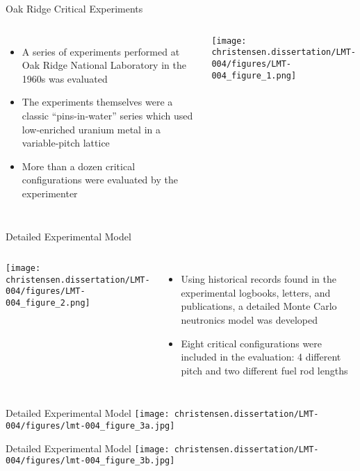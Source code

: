 \documentclass[10pt,aspectratio=169]{beamer}              %
\begin{document}
\begin{frame}{Oak Ridge Critical Experiments}
    \begin{columns}
            \begin{itemize}
                \item A series of experiments performed at Oak Ridge National Laboratory in the 1960s was evaluated
                \item The experiments themselves were a classic ``pins-in-water'' series which used low-enriched uranium metal in a variable-pitch lattice
                \item More than a dozen critical configurations were evaluated by the experimenter
            \end{itemize}
            \centering
            \texttt{[image: christensen.dissertation/LMT-004/figures/LMT-004\_figure\_1.png]}
    \end{columns}
\end{frame}

\begin{frame}{Detailed Experimental Model}
    \begin{columns}
            \centering
            \texttt{[image: christensen.dissertation/LMT-004/figures/LMT-004\_figure\_2.png]}
            \begin{itemize}
                \item Using historical records found in the experimental logbooks, letters, and publications, a detailed Monte Carlo neutronics model was developed
                \item Eight critical configurations were included in the evaluation: 4 different pitch and two different fuel rod lengths
            \end{itemize}
    \end{columns}
\end{frame}

\begin{frame}{Detailed Experimental Model}
    \centering
    \texttt{[image: christensen.dissertation/LMT-004/figures/lmt-004\_figure\_3a.jpg]}
\end{frame}

\begin{frame}{Detailed Experimental Model}
    \centering
    \texttt{[image: christensen.dissertation/LMT-004/figures/lmt-004\_figure\_3b.jpg]}
\end{frame}
\end{document}
